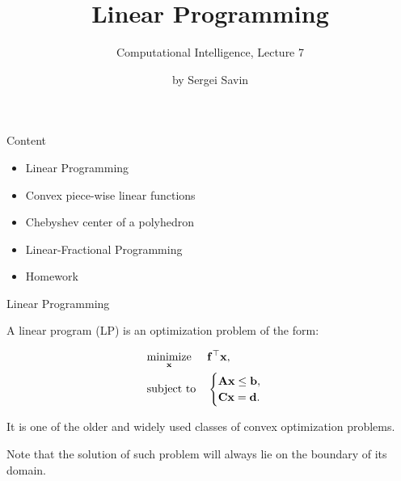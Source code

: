 \documentclass{beamer}
\title{Linear Programming}
\subtitle{Computational Intelligence, Lecture 7}
\author{by Sergei Savin}
\date{\mydate}
\begin{document}
\maketitle


\begin{frame}{Content}

\begin{itemize}
\item Linear Programming
\item Convex piece-wise linear functions
\item Chebyshev center of a polyhedron
\item Linear-Fractional Programming
\item Homework
\end{itemize}

\end{frame}



\begin{frame}{Linear Programming}
\begin{flushleft}

A linear program (LP) is an optimization problem of the form:

\begin{equation} \label{LP}
	\begin{aligned}
		& \underset{\mathbf{x}}{\text{minimize}}
		& & \mathbf{f}^\top \mathbf{x} , \\
		& \text{subject to}
		& & \begin{cases} 
			\mathbf{A}\mathbf{x} \leq \mathbf{b}, \\
			\mathbf{C}\mathbf{x} = \mathbf{d}.
		\end{cases}
	\end{aligned}
\end{equation}

It is one of the older and widely used classes of convex optimization problems. 

\bigskip

Note that the solution of such problem will always lie on the boundary of its domain.
 
\end{flushleft}
\end{frame}
\end{document}

